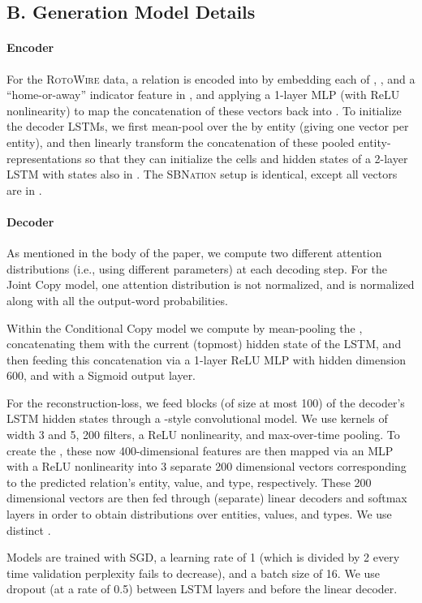 \documentclass[11pt,letterpaper]{article}
\begin{document}
\subsection*{B. Generation Model Details}
\label{sec:suppgen}
\paragraph{Encoder} For the \textsc{RotoWire} data, a relation  is encoded into  by embedding each of , ,  and a ``home-or-away'' indicator feature in , and applying a 1-layer MLP (with ReLU nonlinearity) to map the concatenation of these vectors back into . To initialize the decoder LSTMs, we first mean-pool over the  by entity (giving one vector per entity), and then linearly transform the concatenation of these pooled entity-representations so that they can initialize the cells and hidden states of a 2-layer LSTM with states also in . The \textsc{SBNation} setup is identical, except all vectors are in .

\paragraph{Decoder} As mentioned in the body of the paper, we compute two different attention distributions (i.e., using different parameters) at each decoding step. For the Joint Copy model, one attention distribution is not normalized, and is normalized along with all the output-word probabilities. 

Within the Conditional Copy model we compute  by mean-pooling the , concatenating them with the current (topmost) hidden state of the LSTM, and then feeding this concatenation via a 1-layer ReLU MLP with hidden dimension 600, and with a Sigmoid output layer. 

For the reconstruction-loss, we feed blocks (of size at most 100) of the decoder's LSTM hidden states through a \cite{kim2014convolutional}-style convolutional model. We use kernels of width 3 and 5, 200 filters, a ReLU nonlinearity, and max-over-time pooling. To create the , these now 400-dimensional features are then mapped via an MLP with a ReLU nonlinearity into 3 separate 200 dimensional vectors corresponding to the predicted relation's entity, value, and type, respectively. These 200 dimensional vectors are then fed through (separate) linear decoders and softmax layers in order to obtain distributions over entities, values, and types. We use  distinct .

Models are trained with SGD, a learning rate of 1 (which is divided by 2 every time validation perplexity fails to decrease), and a batch size of 16. We use dropout (at a rate of 0.5) between LSTM layers and before the linear decoder.
\end{document}
